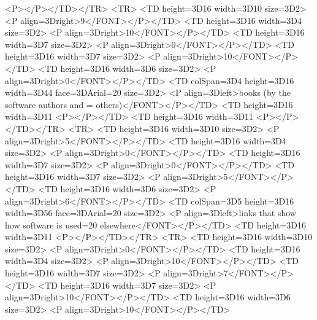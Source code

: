             <P></P></TD></TR>
    <TR>
        <TD height=3D16 width=3D10%
size=3D2>
            <P align=3Dright>9</FONT></P></TD>
        <TD height=3D16 width=3D4%
size=3D2>
            <P align=3Dright>10</FONT></P></TD>
        <TD height=3D16 width=3D7%
size=3D2>
            <P align=3Dright>0</FONT></P></TD>
        <TD height=3D16 width=3D7%
size=3D2>
            <P align=3Dright>10</FONT></P></TD>
        <TD height=3D16 width=3D6%
size=3D2>
            <P align=3Dright>0</FONT></P></TD>
        <TD colSpan=3D4 height=3D16 width=3D44%
face=3DArial=20
            size=3D2>
            <P align=3Dleft>books (by the software authors and =
others)</FONT></P></TD>
        <TD height=3D16 width=3D11%
            <P></P></TD>
        <TD height=3D16 width=3D11%
            <P></P></TD></TR>
    <TR>
        <TD height=3D16 width=3D10%
size=3D2>
            <P align=3Dright>5</FONT></P></TD>
        <TD height=3D16 width=3D4%
size=3D2>
            <P align=3Dright>0</FONT></P></TD>
        <TD height=3D16 width=3D7%
size=3D2>
            <P align=3Dright>0</FONT></P></TD>
        <TD height=3D16 width=3D7%
size=3D2>
            <P align=3Dright>5</FONT></P></TD>
        <TD height=3D16 width=3D6%
size=3D2>
            <P align=3Dright>6</FONT></P></TD>
        <TD colSpan=3D5 height=3D16 width=3D56%
face=3DArial=20
            size=3D2>
            <P align=3Dleft>links that show how software is used=20
            elsewhere</FONT></P></TD>
        <TD height=3D16 width=3D11%
            <P></P></TD></TR>
    <TR>
        <TD height=3D16 width=3D10%
size=3D2>
            <P align=3Dright>0</FONT></P></TD>
        <TD height=3D16 width=3D4%
size=3D2>
            <P align=3Dright>10</FONT></P></TD>
        <TD height=3D16 width=3D7%
size=3D2>
            <P align=3Dright>7</FONT></P></TD>
        <TD height=3D16 width=3D7%
size=3D2>
            <P align=3Dright>10</FONT></P></TD>
        <TD height=3D16 width=3D6%
size=3D2>
            <P align=3Dright>10</FONT></P></TD>
